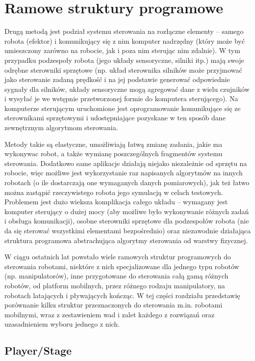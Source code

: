 \section{Ramowe struktury programowe}

Drugą metodą jest podział systemu sterowania na rozłączne elementy -- samego
robota (efektor) i komunikujący się z nim komputer nadrzędny (który może być umieszczony
zarówno na robocie, jak i poza nim sterując nim zdalnie). W tym przypadku podzespoły
robota (jego układy sensoryczne, silniki itp.) mają swoje odrębne sterowniki sprzętowe
(np. układ sterownika silników może przyjmować jako sterowanie zadaną prędkość
i na jej podstawie generować odpowiednie sygnały dla silników, układy sensoryczne
mogą agregować dane z wielu czujników i wysyłać je we wstępnie przetworzonej formie
do komputera sterującego). Na komputerze sterującym uruchomione jest oprogramowanie
komunikujące się ze sterownikami sprzętowymi i udostępniające pozyskane w ten sposób
dane zewnętrznym algorytmom sterowania.

Metody takie są elastyczne, umożliwiają łatwą zmianę zadania, jakie ma wykonywac robot,
a także wymianę poszczególnych fragmentów systemu sterowania. Dodatkowo same aplikacje
działają niejako niezależnie od sprzętu na robocie, więc możliwe jest wykorzystanie
raz napisanych algorytmów na innych robotach (o ile dostarczają one wymaganych danych
pomiarowych), jak też łatwo można zastąpić rzeczywistego robota jego symulacją w celach
testowych. Problemem jest dużo wieksza komplikacja całego układu -- wymagany jest
komputer sterujący o dużej mocy (aby możliwe było wykonywanie różnych zadań i obsługa
komunikacji), osobne sterowniki sprzętowe dla podzespołów robota (nie da się sterować
wszystkimi elementami bezpośrednio) oraz niezawodnie działająca struktura programowa
abstrachująca algorytmy sterowania od warstwy fizycznej.

W ciągu ostatnich lat powstało wiele ramowych struktur programowych do sterowania
robotami, niektóre z nich specjalizowane dla jednego typu robotów (np. manipulatorów),
inne przygotowane do sterowania całą gamą różnych robotów, od platform mobilnych,
przez różnego rodzaju manipulatory, na robotach latających i pływających kończąc.
W tej części rozdziału przedstawię porównanie kilku struktur przeznaczonych do
sterowania m.in. robotami mobilnymi, wraz z zestawieniem wad i zalet każdego z rozwiązań
oraz uzasadnieniem wyboru jednego z nich.


\subsection{Player/Stage}

